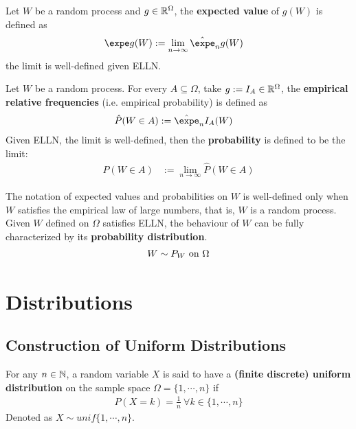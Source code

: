 \documentclass{article}
\begin{document}
   	\begin{definition}
   		Let $W$ be a random process and $g \in \mathbb{R}^\Omega$, the \textbf{expected value} of $g(W)$ is defined as
   		\begin{align}
   			\expe g(W) &:= \lim_{n \to \infty} \hat{\expe}_ng(W)
   		\end{align}
   		the limit is well-defined given ELLN.
   	\end{definition}
   	
   	\begin{definition}
   		Let $W$ be a random process. For every $A \subseteq \Omega$, take $g := I_A \in \mathbb{R}^\Omega$, the \textbf{empirical relative frequencies} (i.e. empirical probability) is defined as
   		\begin{align}
   			\hat{P}(W \in A) &:= \hat{\expe}_n I_A(W)
   		\end{align}
   		Given ELLN, the limit is well-defined, then the \textbf{probability} is defined to be the limit:
   		\begin{align}
   			P(W \in A) &:= \lim_{n \to \infty} \hat{P}(W \in A)
   		\end{align}
   	\end{definition}
   	
   	\begin{remark}
   		The notation of expected values and probabilities on $W$ is well-defined only when $W$ satisfies the empirical law of large numbers, that is, $W$ is a random process. \\
   		Given $W$ defined on $\Omega$ satisfies ELLN, the behaviour of $W$ can be fully characterized by its \textbf{probability distribution}.
   		\begin{align}
   			W \sim P_W \text{{ on }} \Omega
   		\end{align}
   	\end{remark}
















   	\section{Distributions}
	
	\subsection{Construction of Uniform Distributions}
   	\begin{definition}
   		For any $n \in \mathbb{N}$, a random variable $X$ is said to have a \textbf{(finite discrete) uniform distribution} on the sample space $\Omega = \{1,\cdots,n\}$ if
   		\begin{align}
   			P(X=k) = \frac{1}{n}\ \forall k \in \{1,\cdots,n\}
   		\end{align}
   		Denoted as $X \sim unif\{1,\cdots,n\}$.
   	\end{definition}
\end{document}
